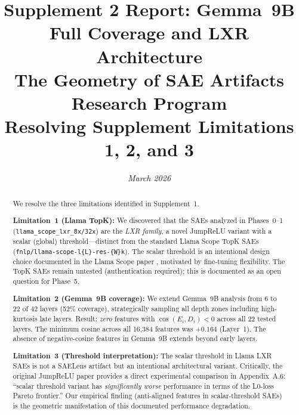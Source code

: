 \documentclass[11pt,a4paper]{article}
\title{\Large\bfseries Supplement 2 Report: Gemma~9B Full Coverage and LXR Architecture\\[0.5em]
\large The Geometry of SAE Artifacts Research Program\\[0.3em]
\normalsize Resolving Supplement Limitations 1, 2, and 3}
\author{\textit{March 2026}}
\date{}
\newcommand{\cosED}{\cos(E_i, D_i)}
\begin{document}
\maketitle\thispagestyle{fancy}

\begin{abstract}
\noindent We resolve the three limitations identified in Supplement~1. 

\textbf{Limitation~1 (Llama TopK):} We discovered that the SAEs analyzed in Phases~0--1 (\texttt{llama\_scope\_lxr\_8x/32x}) are the \emph{LXR family}, a novel JumpReLU variant with a scalar (global) threshold---distinct from the standard Llama Scope TopK SAEs (\texttt{fnlp/llama-scope-l\{L\}-res-\{W\}k}). The scalar threshold is an intentional design choice documented in the Llama Scope paper \citep{he2024}, motivated by fine-tuning flexibility. The TopK SAEs remain untested (authentication required); this is documented as an open question for Phase~5.

\textbf{Limitation~2 (Gemma~9B coverage):} We extend Gemma~9B analysis from 6 to 22 of 42 layers (52\% coverage), strategically sampling all depth zones including high-kurtosis late layers. Result: \emph{zero} features with $\cosED < 0$ across all 22 tested layers. The minimum cosine across all 16,384 features was $+0.164$ (Layer~1). The absence of negative-cosine features in Gemma~9B extends beyond early layers.

\textbf{Limitation~3 (Threshold interpretation):} The scalar threshold in Llama LXR SAEs is not a SAELens artifact but an intentional architectural variant. Critically, the original JumpReLU paper \citep{rajamanoharan2024} provides a direct experimental comparison in Appendix~A.6: ``scalar threshold variant has \emph{significantly worse} performance in terms of the L0-loss Pareto frontier.'' Our empirical finding (anti-aligned features in scalar-threshold SAEs) is the geometric manifestation of this documented performance degradation.
\end{abstract}

\medskip\noindent{}
\end{document}
